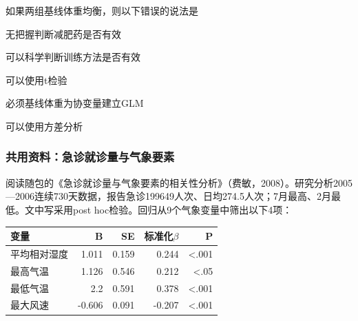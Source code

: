 \par\addvspace{6pt}\noindent\begin{minipage}{\linewidth}


如果两组基线体重均衡，则以下错误的说法是


\begin{choices}

\item 无把握判断减肥药是否有效

\item 可以科学判断训练方法是否有效

\item 可以使用t检验

\item 必须基线体重为协变量建立GLM

\item 可以使用方差分析

\end{choices}

\end{minipage}\par\vspace{4pt}

\subsubsection*{共用资料：急诊就诊量与气象要素}

阅读随包的《急诊就诊量与气象要素的相关性分析》（费敏，2008）。研究分析2005---2006连续730天数据，报告急诊199649人次、日均274.5人次；7月最高、2月最低。文中写采用post hoc检验。回归从9个气象变量中筛出以下4项：

\begin{center}\small\setlength{\tabcolsep}{3.5pt}\renewcommand{\arraystretch}{1.18}\begin{tabular}{@{}lrrrr@{}}
\toprule
变量 & B & SE & 标准化\(\beta\) & P \\
\midrule

平均相对湿度 & 1.011 & 0.159 & 0.244 & \textless.001 \\
最高气温 & 1.126 & 0.546 & 0.212 & \textless.05 \\
最低气温 & 2.2 & 0.591 & 0.378 & \textless.001 \\
最大风速 & -0.606 & 0.091 & -0.207 & \textless.001 \\
\bottomrule\end{tabular}\end{center}

